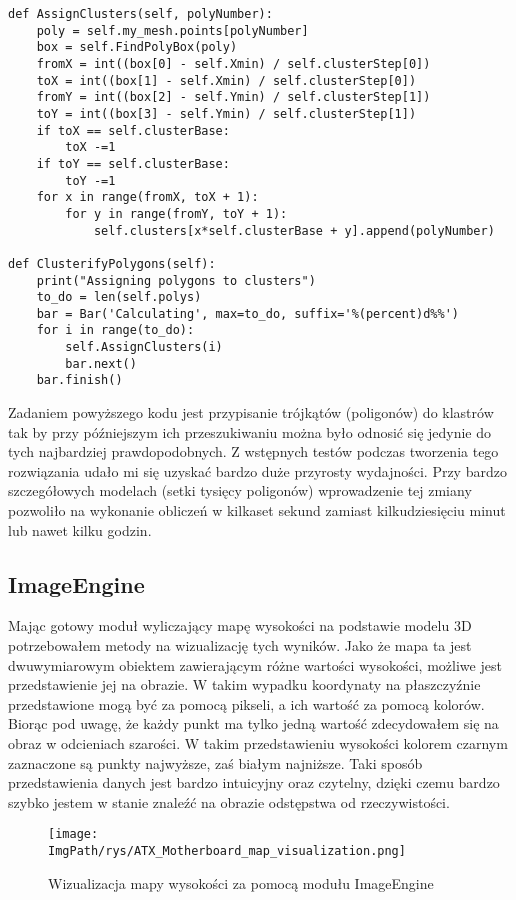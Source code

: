 \documentclass[a4paper,12pt,twoside,openany]{report}
\newcommand{\ImgPath}{.}
\begin{document}
      \begin{lstlisting}
def AssignClusters(self, polyNumber):
    poly = self.my_mesh.points[polyNumber]
    box = self.FindPolyBox(poly)
    fromX = int((box[0] - self.Xmin) / self.clusterStep[0])
    toX = int((box[1] - self.Xmin) / self.clusterStep[0])
    fromY = int((box[2] - self.Ymin) / self.clusterStep[1])
    toY = int((box[3] - self.Ymin) / self.clusterStep[1])
    if toX == self.clusterBase:
        toX -=1
    if toY == self.clusterBase:
        toY -=1
    for x in range(fromX, toX + 1):
        for y in range(fromY, toY + 1):
            self.clusters[x*self.clusterBase + y].append(polyNumber)
    
def ClusterifyPolygons(self):
    print("Assigning polygons to clusters")
    to_do = len(self.polys)
    bar = Bar('Calculating', max=to_do, suffix='%(percent)d%%')
    for i in range(to_do):
        self.AssignClusters(i)
        bar.next()
    bar.finish()
      \end{lstlisting}
      Zadaniem powyższego kodu jest przypisanie trójkątów (poligonów) do klastrów tak by przy późniejszym ich 
      przeszukiwaniu można było odnosić się jedynie do tych najbardziej prawdopodobnych. Z wstępnych testów 
      podczas tworzenia tego rozwiązania udało mi się uzyskać bardzo duże przyrosty wydajności. Przy bardzo 
      szczegółowych modelach (setki tysięcy poligonów) wprowadzenie tej zmiany pozwoliło na wykonanie obliczeń 
      w kilkaset sekund zamiast kilkudziesięciu minut lub nawet kilku godzin.

    \subsection{ImageEngine}
      Mając gotowy moduł wyliczający mapę wysokości na podstawie modelu 3D potrzebowałem metody na wizualizację 
      tych wyników. Jako że mapa ta jest dwuwymiarowym obiektem zawierającym różne wartości wysokości, możliwe 
      jest przedstawienie jej na obrazie. W takim wypadku koordynaty na płaszczyźnie przedstawione mogą być za pomocą 
      pikseli, a ich wartość za pomocą kolorów. Biorąc pod uwagę, że każdy punkt ma tylko jedną wartość zdecydowałem się 
      na obraz w odcieniach szarości. W takim przedstawieniu wysokości kolorem czarnym zaznaczone są punkty najwyższe, zaś 
      białym najniższe. Taki sposób przedstawienia danych jest bardzo intuicyjny oraz czytelny, dzięki czemu bardzo szybko 
      jestem w stanie znaleźć na obrazie odstępstwa od rzeczywistości.
      \begin{figure}[!htbp]
        \begin{center}
      \centering
      \texttt{[image: \\ImgPath/rys/ATX\_Motherboard\_map\_visualization.png]}
      \end{center}
        \caption{Wizualizacja mapy wysokości za pomocą modułu ImageEngine}
        \label{ATXhmap}
      \end{figure}
      \clearpage
\end{document}
